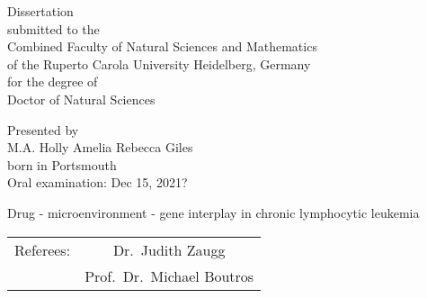 \documentclass[11pt, a4paper, twosided]{book}
\begin{document}

\thispagestyle{empty}
  \begin{center}
  {\Large{Dissertation\\
    submitted to the\\
    Combined Faculty of Natural Sciences and Mathematics\\
    of the Ruperto Carola University Heidelberg, Germany\\
    for the degree of\\
    Doctor of Natural Sciences\\}} \vspace*{\fill}

  \Large{Presented by} \\\vspace{0.5cm}
  \Large{M.A. Holly Amelia Rebecca Giles} \\
  \Large{born in Portsmouth} \\
  \Large{Oral examination: Dec 15, 2021?}

\end{center}
\newpage\null\thispagestyle{empty}\newpage


\pagebreak
\thispagestyle{empty}
\null
\begin{center}
\Large{Drug - microenvironment - gene interplay in chronic lymphocytic leukemia} \\
\vspace*{\fill}
\begin{tabular}{ c c }
Referees: & Dr.~Judith Zaugg \\
          & Prof.~Dr.~Michael Boutros
\end{tabular}
\end{center}
\newpage\null\thispagestyle{empty}\newpage

\end{document}

